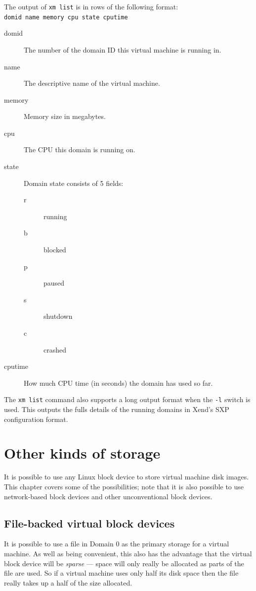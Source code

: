 \documentclass[11pt,twoside,final,openright]{xenstyle}
\begin{document}
The output of {\tt xm list} is in rows of the following format:\\
\verb_domid name memory cpu state cputime_

\begin{description}
\item[domid] The number of the domain ID this virtual machine is running in.
\item[name]  The descriptive name of the virtual machine.
\item[memory] Memory size in megabytes.
\item[cpu]   The CPU this domain is running on.
\item[state] Domain state consists of 5 fields:
  \begin{description}
  \item[r] running
  \item[b] blocked
  \item[p] paused
  \item[s] shutdown
  \item[c] crashed
  \end{description}
\item[cputime] How much CPU time (in seconds) the domain has used so far.
\end{description}

The {\tt xm list} command also supports a long output format when the
{\tt -l} switch is used.  This outputs the fulls details of the
running domains in Xend's SXP configuration format.

\chapter{Other kinds of storage}

It is possible to use any Linux block device to store virtual machine
disk images.  This chapter covers some of the possibilities; note that
it is also possible to use network-based block devices and other
unconventional block devices.

\section{File-backed virtual block devices}

It is possible to use a file in Domain 0 as the primary storage for a
virtual machine.  As well as being convenient, this also has the
advantage that the virtual block device will be {\em sparse} --- space
will only really be allocated as parts of the file are used.  So if a
virtual machine uses only half its disk space then the file really
takes up a half of the size allocated.
\end{document}
